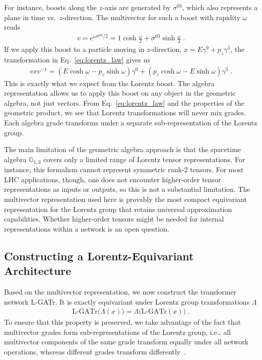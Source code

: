 \documentclass[submission, Phys]{SciPost}
\begin{document}
For instance, boosts along the $z$-axis are generated by $\sigma^{03}$, which also represents a plane in time vs.\ $z$-direction. The multivector for such a boost with rapidity $\omega$ reads
%
\begin{align}
    v = e^{\omega \sigma^{03}/2} = 1\cosh \frac{\omega}{2} + \sigma^{03}\sinh \frac{\omega}{2}  \; .
\end{align}
%
If we apply this boost to a particle moving in $z$-direction, $x=E\gamma^0+p_z\gamma^3$, the transformation in Eq.~\eqref{eq:lorentz_law} gives us 
%
\begin{align}
    vxv^{-1} = (E\cosh \omega - p_z\sinh \omega)\gamma^0 + (p_z\cosh \omega - E\sinh \omega)\gamma^3 \; .
\end{align}
%
This is exactly what we expect from the Lorentz boost. The algebra representation allows us to apply this boost on any object in the geometric algebra, not just vectors. From Eq.~\eqref{eq:lorentz_law} and the properties of the geometric product, we see that Lorentz transformations will never mix grades. Each algebra grade transforms under a separate sub-representation of the Lorentz group.

The main limitation of the geometric algebra approach is that the spacetime algebra $\mathbb{G}_{1,3}$ covers only a limited range of Lorentz tensor representations. For instance, this formalism cannot represent symmetric rank-2 tensors. For most LHC applications, though, one does not encounter higher-order tensor representations as inputs or outputs, so this is not a substantial limitation. The multivector representation used here is provably the most compact equivariant representation for the Lorentz group that retains universal approximation capabilities. Whether higher-order tensors might be needed for internal representations within a network is an open question.

\subsection{Constructing a Lorentz-Equivariant Architecture}

Based on the multivector representation, we now construct the transformer network L-GATr. It is exactly equivariant under Lorentz group transformations $\Lambda$
%
\begin{align}
    \text{L-GATr}\Big(\Lambda(x)\Big) = \Lambda \Big(\text{L-GATr}(x)\Big) \; .
\end{align}
%
To ensure that this property is preserved, we take advantage of the fact that multivector grades form sub-representations of the Lorentz group, i.e., all multivector components of the same grade transform equally under all network operations, whereas different grades transform differently~\cite{brehmer2023geometric,Spinner:2024hjm}.
\end{document}
